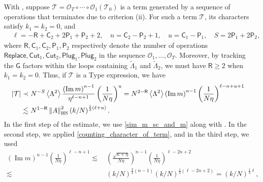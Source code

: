\documentclass[10pt,reqno]{amsart}
\numberwithin{equation}{section}
\numberwithin{figure}{section}
\newcommand{\rmnum}[1]{\uppercase\expandafter{\romannumeral #1}}
\theoremstyle{plain} %
\theoremstyle{definition} %
\newcommand{\wt}{\widetilde}
\renewcommand{\txt}[1]{\text{\rm{#1}}}
\newcommand{\cT}{\mathcal T}
\newcommand{\cO}{{\mathcal{O}}}
\newcommand{\sG}{\mathsf G}
\newcommand{\sR}{\mathsf R}
\newcommand{\sC}{\mathsf C}
\newcommand{\sP}{\mathsf P}
\renewcommand{\geq}{\ge}
\newcommand{\pa}[1]{\left({#1}\right)}
\newcommand{\absa}[1]{\left\lvert #1 \right\rvert}
\newcommand{\norma}[1]{\left\lVert #1 \right\rVert}
\newcommand{\avga}[1]{\left\langle #1 \right\rangle}
\DeclareMathOperator{\im}{\mathrm{Im}}
\newcommand{\tLambda}{{\wt{\Lambda}}}
\newcommand{\sreplace}{\mathsf{Replace}}
\newcommand{\scut}[1]{\mathsf{Cut}_{#1}}
\newcommand{\splug}[1]{\mathsf{Plug}_{#1}}
\newcommand{\HS}{\txt{HS}}
\newcommand{\tl}{\tLambda}
\newcommand{\mm}{\ell}
\numberwithin{equation}{section}
\begin{document}
With , suppose $\cT=\cO_T\circ\cdots\circ\cO_1\pa{\cT_0}$ is a term generated by a sequence of operations that terminates due to criterion (ii). For such a term $\cT$, its characters satisfy $k_1=k_2=0$, and
      \begin{equation}\label{counting_character_of_term}
          \begin{aligned}
              & \mm=-\sR+\sC_2+2\sP_1+\sP_2+2,\quad n=\sC_2-\sP_2+1,\quad u=\sC_1-\sP_1,\quad S=2\sP_1+2\sP_2,
          \end{aligned}
      \end{equation}
      where $\sR,\sC_1,\sC_2,\sP_1,\sP_2$ respectively denote the number of operations $\sreplace,\scut{1},\scut{2},\splug{1},\splug{2}$ in the sequence $\cO_1,\ldots,\cO_T$. Moreover, by tracking the $\sG$ factors within the loops containing $\tl_1$ and $\tl_2$, we must have $\sR\geq 2$ when $k_1=k_2=0$. Thus, if $\cT$ is a Type \rmnum{1} expression, we have
      \begin{equation}\label{estimate_loop_type_1}
          \begin{aligned}
              \absa{\cT}\prec&~ N^{-S}\avga{\Lambda^2}\frac{\pa{\im m}^{n-1}}{\eta^{\mm-n+1}}\pa{\frac{1}{N\eta}}^{u}= N^{2-\sR} \avga{\Lambda^2} \pa{\im m}^{n-1} \pa{\frac{1}{N\eta}}^{\mm-n+u+1}\\
              \lesssim&~N^{1-\sR} \norma{A}_{\HS}^2\pa{k/N}^{\frac 1 3 (\mm+u)}.
          \end{aligned}
      \end{equation}
   In the first step of the estimate, we use \eqref{sim_m_sc_and_m} along with . In the second step, we applied \eqref{counting_character_of_term}, and in the third step, we used
      \begin{equation}\label{light_weight_cancel_imaginary_part}
          \begin{aligned}
              \pa{\im m}^{n-1}\pa{\frac{1}{N\eta}}^{\mm-n+1}\lesssim&~ \pa{\frac{\sqrt{\kappa+\eta}}{N\eta}}^{n-1}\pa{\frac{1}{N\eta}}^{\mm-2n+2}\\
              \lesssim&~ \pa{{k}/{N}}^{\frac{2}{3}(n-1)}\pa{{k}/{N}}^{\frac{1}{3}(\mm-2n+2)}=\pa{{k}/{N}}^{\frac 1 3 \mm},
          \end{aligned}
      \end{equation}
\end{document}
